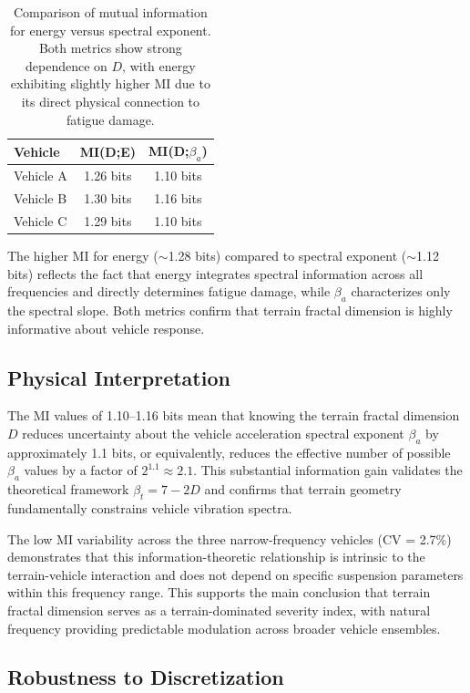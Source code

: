 \documentclass[11pt]{article}
\begin{document}
\begin{table}[h]
\centering
\begin{tabular}{lcc}
\hline
\textbf{Vehicle} & \textbf{MI(D;E)} & \textbf{MI(D;$\beta_a$)} \\
\hline
Vehicle A & 1.26 bits & 1.10 bits \\
Vehicle B & 1.30 bits & 1.16 bits \\
Vehicle C & 1.29 bits & 1.10 bits \\
\hline
\end{tabular}
\caption{Comparison of mutual information for energy versus spectral exponent. Both metrics show strong dependence on $D$, with energy exhibiting slightly higher MI due to its direct physical connection to fatigue damage.}
\end{table}

The higher MI for energy ($\sim$1.28 bits) compared to spectral exponent ($\sim$1.12 bits) reflects the fact that energy integrates spectral information across all frequencies and directly determines fatigue damage, while $\beta_a$ characterizes only the spectral slope. Both metrics confirm that terrain fractal dimension is highly informative about vehicle response.

\subsection{Physical Interpretation}

The MI values of 1.10--1.16 bits mean that knowing the terrain fractal dimension $D$ reduces uncertainty about the vehicle acceleration spectral exponent $\beta_a$ by approximately 1.1 bits, or equivalently, reduces the effective number of possible $\beta_a$ values by a factor of $2^{1.1} \approx 2.1$. This substantial information gain validates the theoretical framework $\beta_t = 7-2D$ and confirms that terrain geometry fundamentally constrains vehicle vibration spectra.

The low MI variability across the three narrow-frequency vehicles (CV = 2.7\%) demonstrates that this information-theoretic relationship is intrinsic to the terrain-vehicle interaction and does not depend on specific suspension parameters within this frequency range. This supports the main conclusion that terrain fractal dimension serves as a terrain-dominated severity index, with natural frequency providing predictable modulation across broader vehicle ensembles.

\subsection{Robustness to Discretization}
\end{document}
